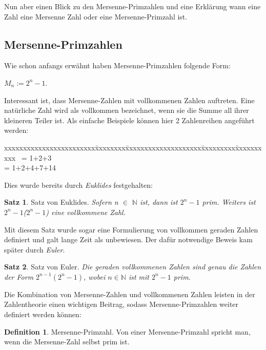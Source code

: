 \documentclass[12pt,a4paper]{article}
\theoremstyle{definition}
\newtheorem{defi}{Definition}[section]
\newtheorem{satz}{Satz}[subsection]
\begin{document}
Nun aber einen Blick zu den Mersenne-Primzahlen und eine Erklärung wann eine Zahl eine Mersenne Zahl oder eine Mersenne-Primzahl ist.

\subsection{Mersenne-Primzahlen}\label{Mersenne-Primzahlen}
Wie schon anfangs erwähnt haben Mersenne-Primzahlen folgende Form:

\begin{center}
$M_n := 2^n-1$.
\end{center}
Interessant ist, dass Mersenne-Zahlen mit vollkommenen Zahlen auftreten.
Eine natürliche Zahl wird als vollkommen bezeichnet, wenn sie die Summe all ihrer kleineren Teiler ist.
Als einfache Beispiele können hier 2 Zahlenreihen angeführt werden:
\begin{tabbing}
xxxxxxxxxxxxxxxxxxxxxxxx\=xxxxxxxx\=xxxxxxxxxxxxxxxxxxxx\=xxxxxxxxx\=xxxxxxxxxx\kill
{} \ = 1+2+3 \\
 = 1+2+4+7+14
\end{tabbing}
Dies wurde bereits durch \textit{Euklides} festgehalten:
\begin{satz}{Satz von Euklides}.\newline
\textit{Sofern n $\in$ $\mathbb{N}$ ist, dann ist $2^n-1$ prim.
Weiters ist $2^n-1$($2^n-1$) eine vollkommene Zahl.} \autocite[168]{RempeGillen2009}
\end{satz}

Mit diesem Satz wurde sogar eine Formulierung von vollkommen geraden Zahlen definiert und galt lange Zeit als unbewiesen.
Der dafür notwendige Beweis kam später durch \textit{Euler}.
\begin{satz}{Satz von Euler}.\newline
\textit{Die geraden vollkommenen Zahlen sind genau die Zahlen der\newline
Form $2^{n-1}(2^n-1)$, wobei $n \in \mathbb{N}$ ist mit $2^n-1$ prim.} \autocite[168]{RempeGillen2009}
\end{satz}

Die Kombination von Mersenne-Zahlen und vollkommenen Zahlen leisten in der Zahlentheorie einen wichtigen Beitrag, sodass Mersenne-Primzahlen weiter definiert werden können:
\begin{defi}{Mersenne-Primzahl}.\newline
Von einer Mersenne-Primzahl spricht man, wenn die Mersenne-Zahl selbst prim ist.
\end{defi}
\end{document}

